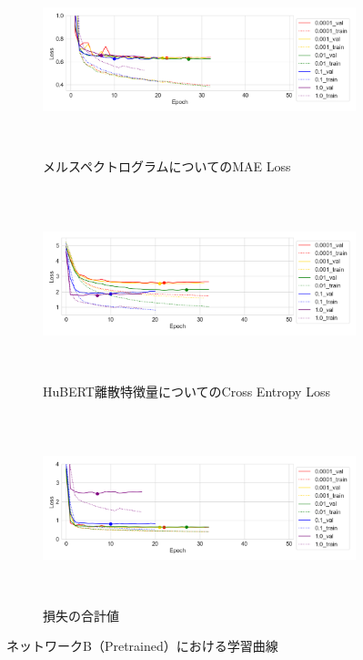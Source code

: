 \begin{figure}[bt]
    \centering
    \begin{subfigure}{\linewidth}
        \centering
        \includegraphics[height=55mm]{./figure/sec4/learning_curves/4/mel_loss.png}
        \caption{メルスペクトログラムについてのMAE Loss}
        \label{sec4:fig:learning_curve_method_4_val_mel_loss}
    \end{subfigure}
    \begin{subfigure}{\linewidth}
        \centering
        \includegraphics[height=55mm]{./figure/sec4/learning_curves/4/ssl_feature_cluster_loss.png}
        \caption{HuBERT離散特徴量についてのCross Entropy Loss}
        \label{sec4:fig:learning_curve_method_4_val_ssl_feature_cluster_loss}
    \end{subfigure}
    \begin{subfigure}{\linewidth}
        \centering
        \includegraphics[height=55mm]{./figure/sec4/learning_curves/4/total_loss.png}
        \caption{損失の合計値}
        \label{sec4:fig:learning_curve_method_4_val_total_loss}
    \end{subfigure}
    \caption{ネットワークB（Pretrained）における学習曲線}
    \label{sec4:fig:learning_curve_method_4_val_losses}
\end{figure}

